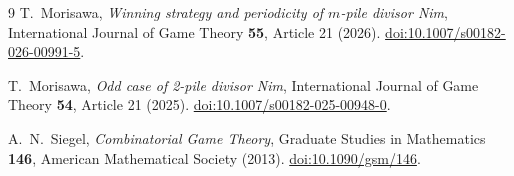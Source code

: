 \documentclass[10pt,a4paper]{article}
\begin{document}
\begin{thebibliography}{9}
\setlength{\itemsep}{2pt}
T.~Morisawa,
\emph{Winning strategy and periodicity of $m$-pile divisor Nim},
International Journal of Game Theory \textbf{55}, Article 21 (2026).
\href{https://doi.org/10.1007/s00182-026-00991-5}
{doi:10.1007/s00182-026-00991-5}.

T.~Morisawa,
\emph{Odd case of 2-pile divisor Nim},
International Journal of Game Theory \textbf{54}, Article 21 (2025).
\href{https://doi.org/10.1007/s00182-025-00948-0}
{doi:10.1007/s00182-025-00948-0}.

A.~N.~Siegel,
\emph{Combinatorial Game Theory},
Graduate Studies in Mathematics \textbf{146},
American Mathematical Society (2013).
\href{https://doi.org/10.1090/gsm/146}{doi:10.1090/gsm/146}.
\end{thebibliography}
\end{document}
